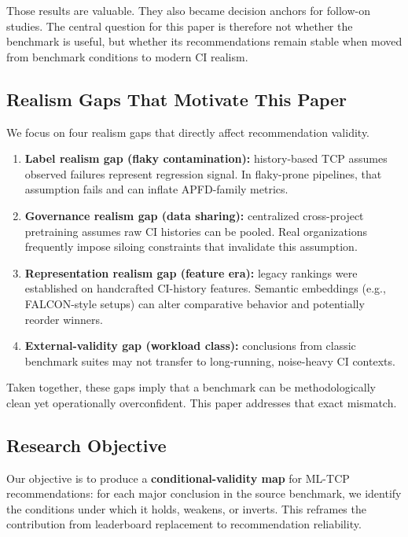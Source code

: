 \documentclass[conference]{IEEEtran}
\begin{document}
Those results are valuable. They also became decision anchors for follow-on studies. The central question for this paper is therefore not whether the benchmark is useful, but whether its recommendations remain stable when moved from benchmark conditions to modern CI realism.


\subsection{Realism Gaps That Motivate This Paper}

We focus on four realism gaps that directly affect recommendation validity.


\begin{enumerate}[leftmargin=*]
\item \textbf{Label realism gap (flaky contamination):} history-based TCP assumes observed failures represent regression signal. In flaky-prone pipelines, that assumption fails and can inflate APFD-family metrics.
\item \textbf{Governance realism gap (data sharing):} centralized cross-project pretraining assumes raw CI histories can be pooled. Real organizations frequently impose siloing constraints that invalidate this assumption.
\item \textbf{Representation realism gap (feature era):} legacy rankings were established on handcrafted CI-history features. Semantic embeddings (e.g., FALCON-style setups) can alter comparative behavior and potentially reorder winners.
\item \textbf{External-validity gap (workload class):} conclusions from classic benchmark suites may not transfer to long-running, noise-heavy CI contexts.
\end{enumerate}

Taken together, these gaps imply that a benchmark can be methodologically clean yet operationally overconfident. This paper addresses that exact mismatch.


\subsection{Research Objective}

Our objective is to produce a \textbf{conditional-validity map} for ML-TCP recommendations: for each major conclusion in the source benchmark, we identify the conditions under which it holds, weakens, or inverts. This reframes the contribution from leaderboard replacement to recommendation reliability.
\end{document}
